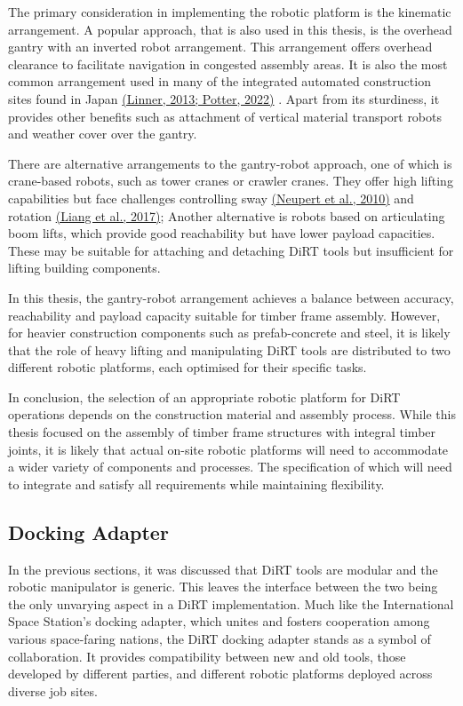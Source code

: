 \vspace{3\baselineskip}
The primary consideration in implementing the robotic platform is the kinematic arrangement. A popular approach, that is also used in this thesis, is the overhead gantry with an inverted robot arrangement. This arrangement offers overhead clearance to facilitate navigation in congested assembly areas. It is also the most common arrangement used in many of the integrated automated construction sites found in Japan \href{https://www.zotero.org/google-docs/?EF3GMo}{(Linner, 2013; Potter, 2022)} . Apart from its sturdiness, it provides other benefits such as attachment of vertical material transport robots and weather cover over the gantry.

There are alternative arrangements to the gantry-robot approach, one of which is crane-based robots, such as tower cranes or crawler cranes. They offer high lifting capabilities but face challenges controlling sway \href{https://www.zotero.org/google-docs/?Cg17jt}{(Neupert et al., 2010)} and rotation \href{https://www.zotero.org/google-docs/?xytkc0}{(Liang et al., 2017)}; Another alternative is robots based on articulating boom lifts, which provide good reachability but have lower payload capacities. These may be suitable for attaching and detaching DiRT tools but insufficient for lifting building components. 

In this thesis, the gantry-robot arrangement achieves a balance between accuracy, reachability and payload capacity suitable for timber frame assembly. However, for heavier construction components such as prefab-concrete and steel, it is likely that the role of heavy lifting and manipulating DiRT tools are distributed to two different robotic platforms, each optimised for their specific tasks.

In conclusion, the selection of an appropriate robotic platform for DiRT operations depends on the construction material and assembly process. While this thesis focused on the assembly of timber frame structures with integral timber joints, it is likely that actual on-site robotic platforms will need to accommodate a wider variety of components and processes. The specification of which will need to integrate and satisfy all requirements while maintaining flexibility.

\subsection{Docking Adapter}

In the previous sections, it was discussed that DiRT tools are modular and the robotic manipulator is generic. This leaves the interface between the two being the only unvarying aspect in a DiRT implementation. Much like the International Space Station's docking adapter, which unites and fosters cooperation among various space-faring nations, the DiRT docking adapter stands as a symbol of collaboration. It provides compatibility between new and old tools, those developed by different parties, and different robotic platforms deployed across diverse job sites.

